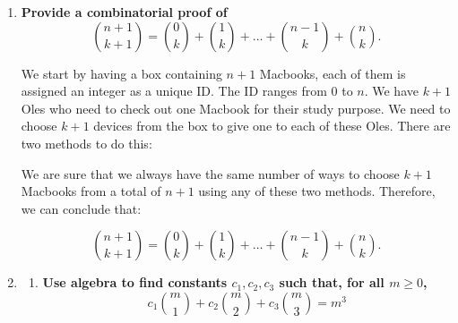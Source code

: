 \documentclass[10pt]{article}
\begin{document}
\begin{enumerate}
\begin{proof}
We are sure that we always have the same number of ways to choose $n$ students using any of these two methods. Therefore, we can conclude that:

$$\sum\limits_{k=0}^n\binom{n}{k}^2=\sum\limits_{k=0}^n\binom{n}{k}\binom{n}{n-k}=\binom{2 \times n}{n}$$ 
\end{proof}

\vskip 1cm

\item\label{sum}
\textbf{Provide a combinatorial proof of
$$\binom{n+1}{k+1} = \binom{0}{k}+ \binom{1}{k}+\ldots+ \binom{n-1}{k}+ \binom{n}{k}.$$}

We start by having a box containing $n+1$ Macbooks, each of them is assigned an integer as a unique ID. The ID ranges from 0 to $n$. We have $k+1$ Oles who need to check out one Macbook for their study purpose. We need to choose $k+1$ devices from the box to give one to each of these Oles. There are two methods to do this:

    We are sure that we always have the same number of ways to choose $k+1$ Macbooks from a total of $n+1$ using any of these two methods. Therefore, we can conclude that:

$$\binom{n+1}{k+1} = \binom{0}{k}+ \binom{1}{k}+\ldots+ \binom{n-1}{k}+ \binom{n}{k}.$$

\vskip 1cm


\item
\begin{enumerate}
\item 
\textbf{Use algebra to find constants $c_1, c_2, c_3$ such that, for all $m\geq0$,
$$c_1\binom{m}{1}+c_2\binom{m}{2}+c_3\binom{m}{3}=m^3$$}


\end{enumerate}
\end{enumerate}
\end{document}
